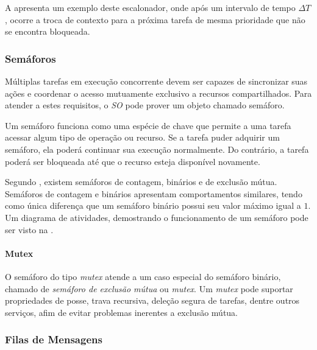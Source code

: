 A  apresenta um exemplo deste escalonador, onde após um intervalo de tempo $\Delta T$, ocorre a troca de contexto para a próxima tarefa de mesma prioridade que não se encontra bloqueada.


\subsubsection{Semáforos}

Múltiplas tarefas em execução concorrente devem ser capazes de sincronizar suas ações e coordenar o acesso mutuamente exclusivo a recursos compartilhados. Para atender a estes requisitos, o \emph{SO} pode prover um objeto chamado semáforo.

Um semáforo funciona como uma espécie de chave que permite a uma tarefa acessar algum tipo de operação ou recurso. Se a tarefa puder adquirir um semáforo, ela poderá continuar sua execução normalmente. Do contrário, a tarefa poderá ser bloqueada até que o recurso esteja disponível novamente.

Segundo , existem semáforos de contagem, binários e de exclusão mútua. Semáforos de contagem e binários apresentam comportamentos similares, tendo como única diferença que um semáforo binário possui seu valor máximo igual a $1$. Um diagrama de atividades, demostrando o funcionamento de um semáforo pode ser visto na .


\paragraph{Mutex}

O semáforo do tipo \emph{mutex} atende a um caso especial do semáforo binário, chamado de \emph{semáforo de exclusão mútua} ou \emph{mutex}. Um \emph{mutex} pode suportar propriedades de posse, trava recursiva, deleção segura de tarefas, dentre outros serviços, afim de evitar problemas inerentes a exclusão mútua.

\subsubsection{Filas de Mensagens}


